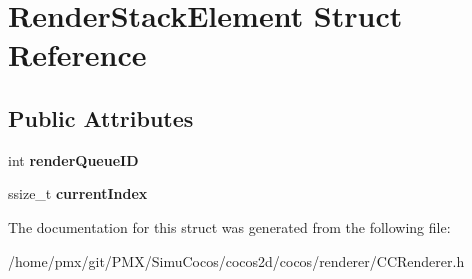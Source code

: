 \hypertarget{structRenderStackElement}{}\section{Render\+Stack\+Element Struct Reference}
\label{structRenderStackElement}
\subsection*{Public Attributes}
\begin{DoxyCompactItemize}
\item 
\mbox{\label{structRenderStackElement_afcc2b70e9b993ba5a49ec1335069f01d}} 
int {\bfseries render\+Queue\+ID}
\item 
\mbox{\label{structRenderStackElement_a0f1d501ecb8ecc1c394ced8708cce68f}} 
ssize\+\_\+t {\bfseries current\+Index}
\end{DoxyCompactItemize}


The documentation for this struct was generated from the following file\+:\begin{DoxyCompactItemize}
\item 
/home/pmx/git/\+P\+M\+X/\+Simu\+Cocos/cocos2d/cocos/renderer/C\+C\+Renderer.\+h\end{DoxyCompactItemize}
